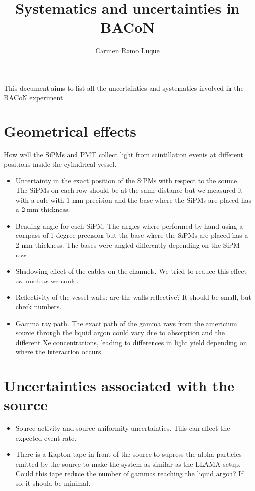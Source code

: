 \documentclass[11pt,a4paper,english,oneside, pdf]{article}
\title{Systematics and uncertainties in BACoN}
\author{Carmen Romo Luque}
\begin{document}
	\maketitle
	
	
	This document aims to list all the uncertainties and systematics involved in the BACoN experiment.
	
	\section{Geometrical effects}

	How well the SiPMs and PMT collect light from scintillation events at different positions inside the cylindrical vessel.

	\begin{itemize}
		\item Uncertainty in the exact position of the SiPMs with respect to the source. The SiPMs on each row should be at the same distance but we measured it with a rule with 1 mm precision and the base where the SiPMs are placed has a 2 mm thickness.
		
		\item Bending angle for each SiPM. The angles where performed by hand using a compass of 1 degree precision but the base where the SiPMs are placed has a 2 mm thickness. The bases were angled differently depending on the SiPM row.
		
		\item Shadowing effect of the cables on the channels. We tried to reduce this effect as much as we could.
		
		\item Reflectivity of the vessel walls: are the walls reflective? It should be small, but check numbers.
		
		\item Gamma ray path. The exact path of the gamma rays from the americium source through the liquid argon could vary due to absorption and the different Xe concentrations, leading to differences in light yield depending on where the interaction occurs.
	\end{itemize}
	
	
	\section{Uncertainties associated with the source}
	
	\begin{itemize}
		\item Source activity and source uniformity uncertainties. This can affect the expected event rate.

		\item There is a Kapton tape in front of the source to supress the alpha particles emitted by the source to make the system as similar as the LLAMA setup. Could this tape reduce the number of gammas reaching the liquid argon? If so, it should be minimal.
	\end{itemize}
	
\end{document}
